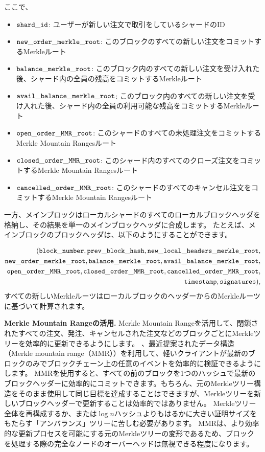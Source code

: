 ここで、
\begin{itemize}
\item ${\mathtt{shard\_id}}$: ユーザーが新しい注文で取引をしているシャードのID 
\item ${\mathtt{new\_order\_merkle\_root}}$: このブロックのすべての新しい注文をコミットするMerkleルート
\item ${\mathtt{balance\_merkle\_root}}$: このブロック内のすべての新しい注文を受け入れた後、シャード内の全員の残高をコミットするMerkleルート  
\item ${\mathtt{avail\_balance\_merkle\_root}}$: このブロック内のすべての新しい注文を受け入れた後、シャード内の全員の利用可能な残高をコミットするMerkleルート
\item ${\mathtt{open\_order\_MMR\_root}}$: このシャードのすべての未処理注文をコミットするMerkle Mountain Rangesルート
\item ${\mathtt{closed\_order\_MMR\_root}}$: このシャード内のすべてのクローズ注文をコミットするMerkle Mountain Rangesルート
\item ${\mathtt{cancelled\_order\_MMR\_root}}$: このシャードのすべてのキャンセル注文をコミットするMerkle Mountain Rangesルート 
\end{itemize}

一方、メインブロックはローカルシャードのすべてのローカルブロックヘッダを格納し、その結果を単一のメインブロックヘッダに合成します。 たとえば、メインブロックのブロックヘッダは、以下のようにすることができます。

\begin{align*}
({\mathtt{block\_number}}, {\mathtt{prev\_block\_hash}}, {\mathtt{new\_local\_headers\_merkle\_root}}, \\ {\mathtt{new\_order\_merkle\_root}}, {\mathtt{balance\_merkle\_root}}, {\mathtt{avail\_balance\_merkle\_root}}, \\ {\mathtt{open\_order\_MMR\_root}}, {\mathtt{closed\_order\_MMR\_root}}, {\mathtt{cancelled\_order\_MMR\_root}},\\ {\mathtt{timestamp}}, {\mathtt{signatures}}),
\end{align*}
すべての新しいMerkleルーツはローカルブロックのヘッダーからのMerkleルーツに基づいて計算されます。

\textbf{Merkle Mountain Rangeの活用.}  Merkle Mountain Rangeを活用して、閉鎖されたすべての注文、発注、キャンセルされた注文などのブロックごとにMerkleツリーを効率的に更新できるようにします。 、最近提案されたデータ構造（Merkle mountain range（MMR））を利用して、軽いクライアントが最新のブロックのみでブロックチェーン上の任意のイベントを効率的に検証できるようにします。
MMRを使用すると、すべての前のブロックを1つのハッシュで最新のブロックヘッダーに効率的にコミットできます。もちろん、元のMerkleツリー構造をそのまま使用して同じ目標を達成することはできますが、Merkleツリーを新しいブロックヘッダーで更新することは効率的ではありません。 Merkleツリー全体を再構成するか、または$\log{n}$ハッシュよりもはるかに大きい証明サイズをもたらす「アンバランス」ツリーに苦しむ必要があります。 MMRは、より効率的な更新プロセスを可能にする元のMerkleツリーの変形であるため、ブロックを処理する際の完全なノードのオーバーヘッドは無視できる程度になります。

